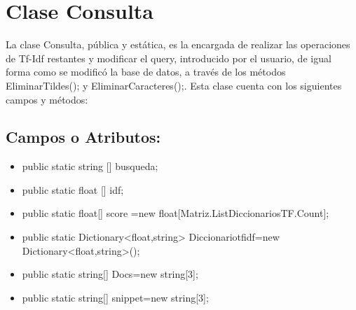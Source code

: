 \documentclass[a4paper,12pt]{article}
\begin{document}
\newpage
\section*{Clase Consulta}

La clase Consulta, pública y estática, es la encargada de realizar las operaciones de Tf-Idf 
restantes y modificar el query, introducido por el usuario, de igual forma como se modificó la 
base de datos, a través de los métodos EliminarTildes(); y EliminarCaracteres();. Esta clase 
cuenta con los siguientes campos y métodos:
\subsection*{Campos o Atributos:}
\begin{itemize}
    \item public static string [] busqueda;
\item public static float [] idf;
\item public static float[] score =new float[Matriz.ListDiccionariosTF.Count]; 
    \item public static Dictionary<float,string> Diccionariotfidf=new Dictionary<float,string>();
    \item public static string[] Docs=new string[3];
    \item public static string[] snippet=new string[3];
 \end{itemize}
\end{document}
